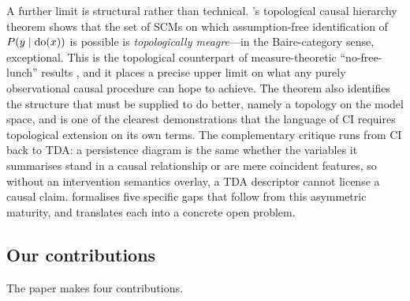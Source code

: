 A further limit is structural rather than technical.
\citet{ibeling2021topological}'s topological causal hierarchy theorem
shows that the set of SCMs on which assumption-free identification of
$P(y \mid \mathrm{do}(x))$ is possible is \emph{topologically meagre}---in
the Baire-category sense, exceptional. This is the topological
counterpart of measure-theoretic ``no-free-lunch'' results
\citep{oxtoby1971measure,belot2020absolutely,genin2017topology,
genin2018topology}, and it places a precise upper limit on what any
purely observational causal procedure can hope to achieve. The
theorem also identifies the structure that must be supplied to do
better, namely a topology on the model space, and is one of the
clearest demonstrations that the language of CI requires topological
extension on its own terms. The complementary critique runs from CI
back to TDA: a persistence diagram is the same whether the variables
it summarises stand in a causal relationship or are mere coincident
features, so without an intervention semantics overlay, a TDA
descriptor cannot license a causal claim. 
formalises five specific gaps that follow from this asymmetric
maturity, and  translates each into a concrete
open problem.

\subsection{Our contributions}\label{sec:intro_contributions}

The paper makes four contributions.

